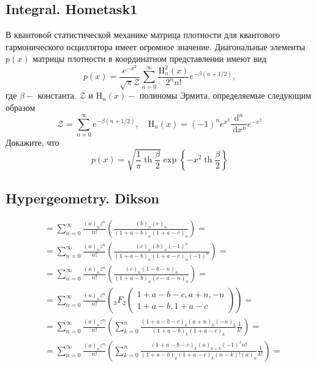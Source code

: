 	\subsection{Integral. Hometask1}
	
	В квантовой статистической механике матрица плотности для квантового гармонического осциллятора имеет огромное значение. Диагональные элементы $p(x)$ матрицы плотности в координатном представлении имеют вид
	$$
	p(x)=\frac{e^{-x^2}}{\sqrt{\pi} \mathcal{Z}} \sum_{n=0}^{\infty} \frac{\mathrm{H}_n^2(x)}{2^n n !} e^{-\beta(n+1 / 2)},
	$$
	где $\beta-$ константа. $\mathcal{Z}$ и $\mathrm{H}_n(x)-$ полиномы Эрмита, определяемые следующим образом
	$$
	\mathcal{Z}=\sum_{n=0}^{\infty} e^{-\beta(n+1 / 2)}, \quad \mathrm{H}_n(x)=(-1)^n e^{x^2} \frac{\mathrm{d}^n}{\mathrm{~d} x^n} e^{-x^2}
	$$
	Докажите, что
	$$
	p(x)=\sqrt{\frac{1}{\pi} \operatorname{th} \frac{\beta}{2}} \exp \left\{-x^2 \operatorname{th} \frac{\beta}{2}\right\}
	$$
	
	\subsection{Hypergeometry. Dikson}
	
	$$
	\begin{aligned}
		& =\sum_{n=0}^{\infty} \frac{(a)_n z^n}{n !}\left(\frac{(b)_n(c)_n}{(1+a-b)_n(1+a-c)_n}\right)= \\
		& =\sum_{n=0}^{\infty} \frac{(a)_n z^n}{n !}\left(\frac{(c)_n(b)_n(-1)^n}{(1+a-b)_n(1+a-c)_n(-1)^n}\right)= \\
		& =\sum_{n=0}^{\infty} \frac{(a)_n z^n}{n !}\left(\frac{(c)_n(1-b-n)_n}{(1+a-b)_n(c-a-n)_n}\right)= \\
		& =\sum_{n=0}^{\infty} \frac{(a)_n z^n}{n !}\left({ }_3 F_2\left(\begin{array}{cc}
			1+a-b-c, a+n,-n \\
			1+a-b, 1+a-c
		\end{array}\right)\right)= \\
		& =\sum_{n=0}^{\infty} \frac{(a)_n z^n}{n !}\left(\sum_{k=0}^n \frac{(1+a-b-c)_k(a+n)_k(-n)_k}{(1+a-b)_k(1+a-c)_k} \frac{1}{k !}\right)= \\
		& =\sum_{n=0}^{\infty} \frac{(a)_n z^n}{n !}\left(\sum_{k=0}^n \frac{(1+a-b-c)_k(a)_{n+k}(-1)^k n !}{(1+a-b)_k(1+a-c)_k(n-k) !(a)_n} \frac{1}{k !}\right)= \\
		&
	\end{aligned}
	$$
	
